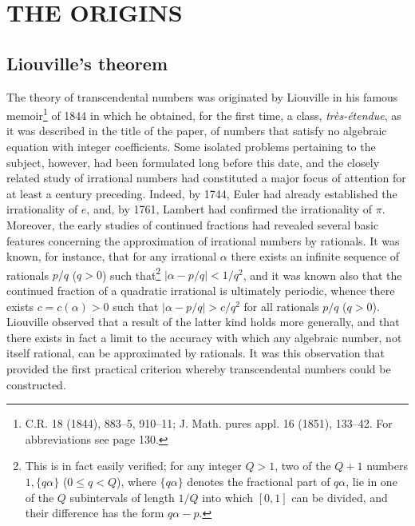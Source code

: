 
\chapter{THE ORIGINS}\label{ch:1}

\section{Liouville's theorem}

The theory of transcendental numbers was originated by Liouville in his famous memoir\footnote{C.R. 18 (1844), 883--5, 910--11; J. Math. pures appl. 16 (1851), 133--42. For abbreviations see page 130.} of 1844 in which he obtained, for the first time, a class, \textit{tr\`es-\'etendue}, as it was described in the title of the paper, of numbers that satisfy no algebraic equation with integer coefficients. Some isolated problems pertaining to the subject, however, had been formulated long before this date, and the closely related study of irrational numbers had constituted a major focus of attention for at least a century preceding. Indeed, by 1744, Euler had already established the irrationality of $e$, and, by 1761, Lambert had confirmed the irrationality of $\pi$. Moreover, the early studies of continued fractions had revealed several basic features concerning the approximation of irrational numbers by rationals. It was known, for instance, that for any irrational $\alpha$ there exists an infinite sequence of rationals $p/q$ ($q>0$) such that\footnote{This is in fact easily verified; for any integer $Q > 1$, two of the $Q+1$ numbers $1, \{q\alpha\}$ ($0 \le q < Q$), where $\{q\alpha\}$ denotes the fractional part of $q\alpha$, lie in one of the $Q$ subintervals of length $1/Q$ into which $[0, 1]$ can be divided, and their difference has the form $q\alpha - p$.} $|\alpha-p/q|<1/q^2$, and it was known also that the continued fraction of a quadratic irrational is ultimately periodic, whence there exists $c = c(\alpha) > 0$ such that  $|\alpha - p/q| > c/q^2$ for all rationals $p/q$ ($q > 0$). Liouville observed that a result of the latter kind holds more generally, and that there exists in fact a limit to the accuracy with which any algebraic number, not itself rational, can be approximated by rationals. It was this observation that provided the first practical criterion whereby transcendental numbers could be constructed.

